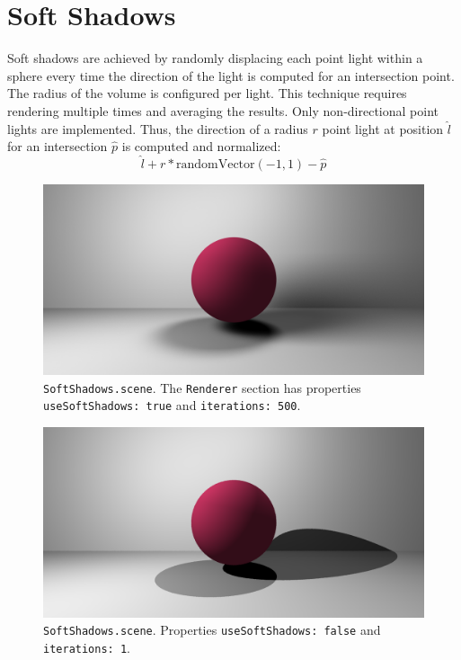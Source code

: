 \documentclass{article}
\begin{document}
\pagebreak

\section{Soft Shadows}

Soft shadows are achieved by randomly displacing each point light within a sphere every time the direction of the light is computed for an intersection point.
The radius of the volume is configured per light.
This technique requires rendering multiple times and averaging the results.
Only non-directional point lights are implemented.
Thus, the direction of a radius $r$ point light at position $\hat{l}$ for an intersection $\hat{p}$ is computed and normalized:
$$
\hat{l} + r * \text{randomVector}(-1, 1) - \hat{p}
$$

\begin{figure}[H]
    \centering
    \includegraphics[width=\textwidth]{./examples/SoftShadows.png}
    \caption{\texttt{SoftShadows.scene}. The \texttt{Renderer} section has properties \texttt{useSoftShadows: true} and \texttt{iterations: 500}.}
\end{figure}

\begin{figure}[H]
    \centering
    \includegraphics[width=\textwidth]{./examples/SoftShadowsOff.png}
    \caption{\texttt{SoftShadows.scene}. Properties \texttt{useSoftShadows: false} and \texttt{iterations: 1}.}
\end{figure}
\end{document}

